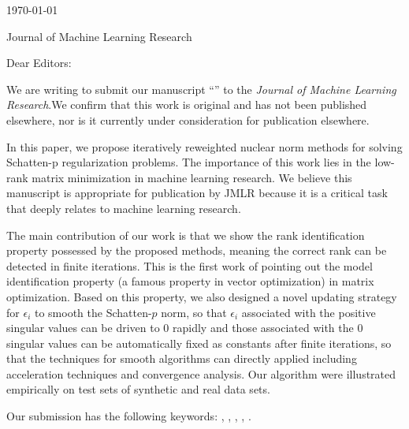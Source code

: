 


\hfill{\today}

Journal of Machine Learning Research

\bigskip

Dear Editors:

We are writing to submit our manuscript ``'' to the \emph{Journal of Machine Learning Research}.We confirm that this work is original and has not been published elsewhere, nor is it currently under consideration for publication elsewhere.


In this paper, we propose iteratively reweighted nuclear norm
methods for solving Schatten-p regularization problems.
The importance of this work lies in the low-rank matrix minimization in machine learning research.
We believe this manuscript is appropriate for publication by JMLR because it is a critical task that deeply relates to machine learning research.

The main contribution of our work is that we show the rank identification property possessed by the proposed methods, meaning the correct rank can be detected in finite iterations. 
This is the first work of pointing out the model identification property (a famous property in vector optimization) in matrix optimization. 
Based on this property, we also designed a novel updating strategy for $\epsilon_{i}$ to smooth the Schatten-$p$ norm, so that $\epsilon_{i}$ associated with the positive singular values can be driven to $0$ rapidly and those associated with the 0 singular values can be automatically fixed as constants after finite iterations, so that the techniques for smooth algorithms can directly applied including acceleration techniques and convergence analysis.
Our algorithm were illustrated empirically on test sets of synthetic and real data sets.

Our submission has the following keywords:
, 
, 
, 
, 
.

